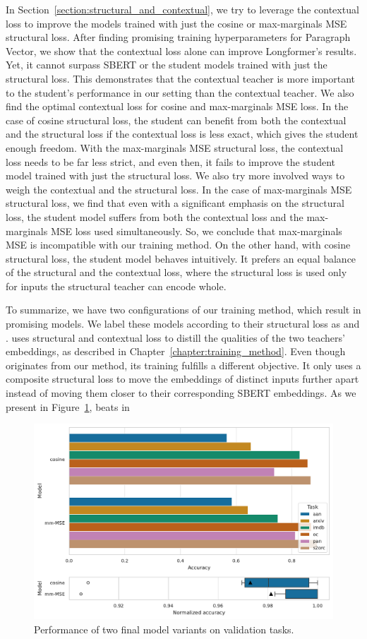 In Section~\ref{section:structural_and_contextual}, we try to leverage the
contextual loss to improve the models trained with just the cosine or
max-marginals MSE structural loss. After finding promising training
hyperparameters for Paragraph Vector, we show that the contextual loss alone
can improve Longformer's results. Yet, it cannot surpass SBERT or the student
models trained with just the structural loss. This demonstrates that the contextual teacher is more important to the student's performance
in our setting than the contextual teacher. We also find the optimal contextual loss for
cosine and max-marginals MSE loss. In the case of cosine structural loss, the student can benefit from both the contextual and the structural loss
if the contextual loss is less exact, which gives the student enough freedom. With
the max-marginals MSE structural loss, the contextual loss needs to be far less
strict, and even then, it fails to improve the student model trained with just
the structural loss. We also try more involved ways to weigh the contextual
and the structural loss. In the case of max-marginals MSE structural loss, we
find that even with a significant emphasis on the structural loss, the student model
suffers from both the contextual loss and the max-marginals MSE loss used simultaneously. So, we conclude that max-marginals MSE is incompatible with
our training method. On the other hand, with cosine structural loss, the student
model behaves intuitively. It prefers an equal balance of the
structural and the contextual loss, where the structural loss is used only for
inputs the structural teacher can encode whole.

To summarize, we have two configurations  of our training method, which result in promising models. We label these models according to their structural loss as  and .  uses structural and contextual loss to distill the qualities of the two teachers' embeddings, as described in Chapter~\ref{chapter:training_method}. Even though  originates from our method, its training fulfills a different objective. It only uses a composite structural loss to move the embeddings of distinct inputs further apart instead of moving them closer to their corresponding SBERT embeddings. As we present in Figure~\ref{fig:experiments_final_comparison},  beats  in 

\begin{figure}
    \centering
    \includegraphics{img/experiments_final_models.pdf}
    \caption{Performance of two final model variants on validation tasks.}
    \label{fig:experiments_final_comparison}
\end{figure}
